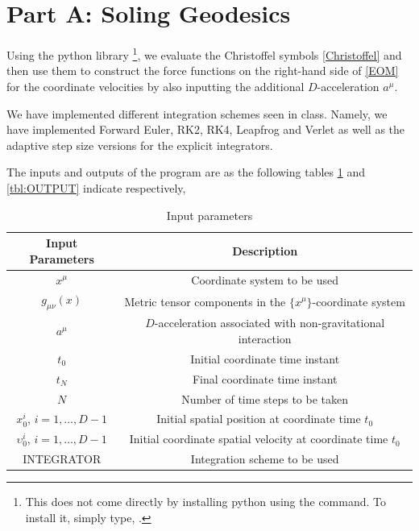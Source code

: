 \section{Part A: Soling Geodesics}
\label{Sec2}

Using the python library \footnote{This does not come directly by installing python using the  command. To install it, simply type, .}, we evaluate the Christoffel symbols \eqref{Christoffel} and then use them to construct the force functions on the right-hand side of \eqref{EOM} for the coordinate velocities by also inputting the additional $D$-acceleration $a^{\mu}$.

We have implemented different integration schemes seen in class. Namely, we have implemented Forward Euler, RK2, RK4, Leapfrog and Verlet as well as the adaptive step size versions for the explicit integrators.

The inputs and outputs of the program are as the following tables \ref{tbl:INPUT} and \ref{tbl:OUTPUT} indicate respectively,
\begin{table}[H]
	\centering
	\begin{tabular}{|c|c|}
		\hline
		Input Parameters & Description \\
		\hline
		\hline
		$x^{\mu}$ & Coordinate system to be used \\
		\hline
		$g_{\mu\nu}(x)$ & Metric tensor components in the $\{x^{\mu}\}$-coordinate system \\
		\hline
		$a^{\mu}$ & $D$-acceleration associated with non-gravitational interaction \\
		\hline
		$t_0$ & Initial coordinate time instant \\
		\hline
		$t_{N}$ & Final coordinate time instant \\
		\hline
		$N$ & Number of time steps to be taken \\
		\hline
		$x^{i}_0$, $i=1,\dots,D-1$ & Initial spatial position at coordinate time $t_0$\\
		\hline
		$\upsilon^{i}_0$, $i=1,\dots,D-1$ & Initial coordinate spatial velocity at coordinate time $t_0$\\
		\hline
		INTEGRATOR & Integration scheme to be used \\
		\hline
	\end{tabular}
	\caption{Input parameters}
	\label{tbl:INPUT}
\end{table}

